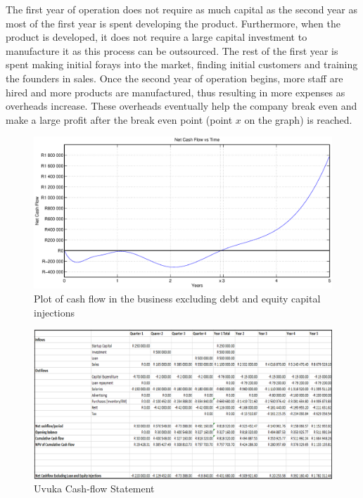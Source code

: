 The first year of operation does not require as much capital as the second year as most of the first year is spent developing the product. Furthermore, when the product is developed, it does not require a large capital investment to manufacture it as this process can be outsourced. The rest of the first year is spent making initial forays into the market, finding initial customers and training the founders in sales. Once the second year of operation begins, more staff are hired and more products are manufactured, thus resulting in more expenses as overheads increase. These overheads eventually help the company break even and make a large profit after the break even point (point $x$ on the graph) is reached.

\begin{figure}[H]
\centering
\includegraphics[width=1\textwidth]{images/cashflow_plot}
\vskip10pt
\caption[Cash-flow plot]{Plot of cash flow in the business excluding debt and equity capital injections}
\label{fig:cashflowplot}
\end{figure}

\newpage
\thispagestyle{plain}
\begin{landscape}
  \begin{figure}[p]
    \centering
    \includegraphics[width=1.6\textwidth]{images/CashFlowStatement_horizontal}
    \vskip10pt
    \caption[Uvuka Cash-Flow Statement]{Uvuka Cash-flow Statement}
    \label{fig:CashFlowStatement_horizontal}
  \end{figure}
\end{landscape}
\newpage


